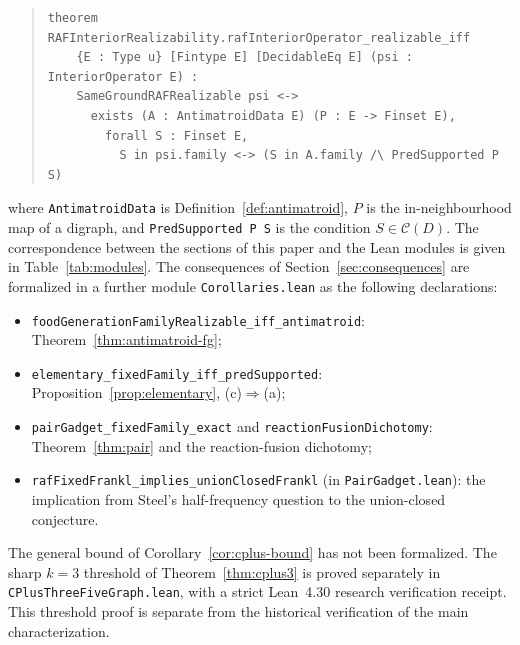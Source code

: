 \documentclass[11pt,a4paper]{article}
\theoremstyle{plain}
\theoremstyle{definition}
\theoremstyle{remark}
\newcommand{\cC}{\mathcal{C}}
\newcommand{\lean}[1]{\texttt{#1}}
\begin{document}
\begin{quote}\small
\begin{verbatim}
theorem RAFInteriorRealizability.rafInteriorOperator_realizable_iff
    {E : Type u} [Fintype E] [DecidableEq E] (psi : InteriorOperator E) :
    SameGroundRAFRealizable psi <->
      exists (A : AntimatroidData E) (P : E -> Finset E),
        forall S : Finset E,
          S in psi.family <-> (S in A.family /\ PredSupported P S)
\end{verbatim}
\end{quote}
where \lean{AntimatroidData} is Definition~\ref{def:antimatroid}, $P$ is the in-neighbourhood map of a digraph, and \lean{PredSupported P S} is the condition $S\in\cC(D)$. The correspondence between the sections of this paper and the Lean modules is given in Table~\ref{tab:modules}. The consequences of Section~\ref{sec:consequences} are formalized in a further module \lean{Corollaries.lean} as the following declarations:
\begin{itemize}
\item \lean{foodGenerationFamilyRealizable\_iff\_antimatroid}: Theorem~\ref{thm:antimatroid-fg};
\item \lean{elementary\_fixedFamily\_iff\_predSupported}: Proposition~\ref{prop:elementary}, (c)$\Rightarrow$(a);
\item \lean{pairGadget\_fixedFamily\_exact} and \lean{reactionFusionDichotomy}: Theorem~\ref{thm:pair} and the reaction-fusion dichotomy;
\item \lean{rafFixedFrankl\_implies\_unionClosedFrankl} (in \lean{PairGadget.lean}): the implication from Steel's half-frequency question to the union-closed conjecture.
\end{itemize}
The general bound of Corollary~\ref{cor:cplus-bound} has not been formalized. The sharp $k=3$ threshold of Theorem~\ref{thm:cplus3} is proved separately in \lean{CPlusThreeFiveGraph.lean}, with a strict Lean~4.30 research verification receipt. This threshold proof is separate from the historical verification of the main characterization.
\end{document}

